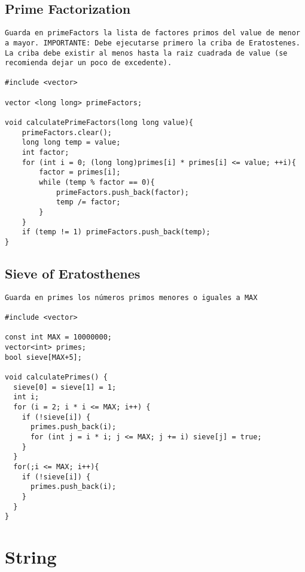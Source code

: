 \documentclass[10pt,letterpaper,twocolumn,twosided]{article}
\begin{document}
\subsection{Prime Factorization}
\begin{lstlisting}
Guarda en primeFactors la lista de factores primos del value de menor a mayor. IMPORTANTE: Debe ejecutarse primero la criba de Eratostenes.  La criba debe existir al menos hasta la raiz cuadrada de value (se  recomienda dejar un poco de excedente).

#include <vector>

vector <long long> primeFactors;

void calculatePrimeFactors(long long value){
	primeFactors.clear();
	long long temp = value;
	int factor;
	for (int i = 0; (long long)primes[i] * primes[i] <= value; ++i){
		factor = primes[i];
		while (temp % factor == 0){
			primeFactors.push_back(factor);
			temp /= factor;
		}
	}
	if (temp != 1) primeFactors.push_back(temp);
}
\end{lstlisting}

\subsection{Sieve of Eratosthenes}
\begin{lstlisting}
Guarda en primes los números primos menores o iguales a MAX

#include <vector>

const int MAX = 10000000;
vector<int> primes;
bool sieve[MAX+5];

void calculatePrimes() {
  sieve[0] = sieve[1] = 1;
  int i;
  for (i = 2; i * i <= MAX; i++) {
    if (!sieve[i]) {
      primes.push_back(i);
      for (int j = i * i; j <= MAX; j += i) sieve[j] = true;
    }
  }
  for(;i <= MAX; i++){
  	if (!sieve[i]) {
      primes.push_back(i);
  	}
  }
}
\end{lstlisting}

\section{String}
\end{document}
